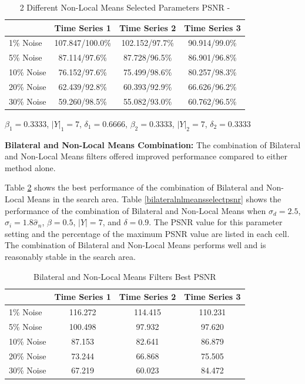 \documentclass[11pt]{article}
\newcommand{\vs}{\vspace{0.1in}}
\theoremstyle{definition}
\begin{document}
\begin{table}[!h]
\small
\begin{center}
\begin{tabular}{l | c | c | c}
 & Time Series 1 & Time Series 2 & Time Series 3 \\ \hline
1\% Noise & 107.847/100.0\% & 102.152/97.7\% & 90.914/99.0\% \\ \hline
5\% Noise & 87.114/97.6\% & 87.728/96.5\% & 86.901/96.8\% \\ \hline
10\% Noise & 76.152/97.6\% & 75.499/98.6\% & 80.257/98.3\% \\ \hline
20\% Noise & 62.439/92.8\% & 60.393/92.9\% & 66.626/96.2\% \\ \hline
30\% Noise & 59.260/98.5\% & 55.082/93.0\% & 60.762/96.5\%
\end{tabular}
\caption{2 Different Non-Local Means Selected Parameters PSNR -}
 $\beta_1 = 0.3333$, $\lvert Y \rvert _1 = 7$, $\delta _1 = 0.6666$, $\beta_2 = 0.3333$, $\lvert Y \rvert _2 = 7$, $\delta _2 = 0.3333$
\label{2diffnlmeansselectpsnr}
\end{center}
\end{table}

\vs
\textbf{Bilateral and Non-Local Means Combination:} The combination of Bilateral and Non-Local Means filters offered improved performance compared to either method alone.

Table \ref{bilateralnlmeansbestpsnr} shows the best performance of the combination of Bilateral and Non-Local Means in the search area. Table \ref{bilateralnlmeansselectpsnr} shows the performance of the combination of Bilateral and Non-Local Means when $\sigma_d = 2.5$, $\sigma_i = 1.8 \hat{\sigma}_n$, $\beta = 0.5$, $\lvert Y \rvert = 7$, and $\delta = 0.9$. The PSNR value for this parameter setting and the percentage of the maximum PSNR value are listed in each cell. The combination of Bilateral and Non-Local Means performs well and is reasonably stable in the search area.

\begin{table}[!h]
\small
\begin{center}
\begin{tabular}{l | c | c | c}
 & Time Series 1 & Time Series 2 & Time Series 3 \\ \hline
1\% Noise & 116.272 & 114.415 & 110.231 \\ \hline
5\% Noise & 100.498 & 97.932 & 97.620 \\ \hline
10\% Noise & 87.153 & 82.641 & 86.879 \\ \hline
20\% Noise & 73.244 & 66.868 & 75.505 \\ \hline
30\% Noise & 67.219 & 60.023 & 84.472
\end{tabular}
\caption{Bilateral and Non-Local Means Filters Best PSNR}
\label{bilateralnlmeansbestpsnr}
\end{center}
\end{table}
\end{document}
